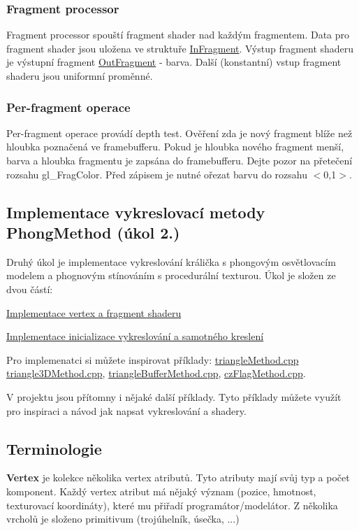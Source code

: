  \hypertarget{index_FragmentProcessor}{}\subsubsection{Fragment processor}\label{index_FragmentProcessor}
Fragment processor spouští fragment shader nad každým fragmentem. Data pro fragment shader jsou uložena ve struktuře \hyperlink{structInFragment}{In\+Fragment}. Výstup fragment shaderu je výstupní fragment \hyperlink{structOutFragment}{Out\+Fragment} -\/ barva. Další (konstantní) vstup fragment shaderu jsou uniformní proměnné. \hypertarget{index_PFO}{}\subsubsection{Per-\/fragment operace}\label{index_PFO}
Per-\/fragment operace provádí depth test. Ověření zda je nový fragment blíže než hloubka poznačená ve framebufferu. Pokud je hloubka nového fragment menší, barva a hloubka fragmentu je zapsána do framebufferu. Dejte pozor na přetečení rozsahu gl\+\_\+\+Frag\+Color. Před zápisem je nutné ořezat barvu do rozsahu $<$0,1$>$.

\hypertarget{index_PhongMethod}{}\subsection{Implementace vykreslovací metody Phong\+Method (úkol 2.)}\label{index_PhongMethod}
Druhý úkol je implementace vykreslování králička s phongovým osvětlovacím modelem a phognovým stínováním s procedurální texturou. Úkol je složen ze dvou částí\+: 
\begin{DoxyItemize}
\item \hyperlink{group__shader__side}{Implementace vertex a fragment shaderu} 
\item \hyperlink{group__cpu__side}{Implementace inicializace vykreslování a samotného kreslení} 
\end{DoxyItemize}Pro implemenatci si můžete inspirovat příklady\+: \hyperlink{triangleMethod_8cpp}{triangle\+Method.\+cpp} \hyperlink{triangle3DMethod_8cpp}{triangle3\+D\+Method.\+cpp}, \hyperlink{triangleBufferMethod_8cpp}{triangle\+Buffer\+Method.\+cpp}, \hyperlink{czFlagMethod_8cpp}{cz\+Flag\+Method.\+cpp}.



V projektu jsou přítomny i nějaké další příklady. Tyto příklady můžete využít pro inspiraci a návod jak napsat vykreslování a shadery.\hypertarget{index_terminologie}{}\subsection{Terminologie}\label{index_terminologie}
{\bfseries Vertex} je kolekce několika vertex atributů. Tyto atributy mají svůj typ a počet komponent. Každý vertex atribut má nějaký význam (pozice, hmotnost, texturovací koordináty), které mu přiřadí programátor/modelátor. Z několika vrcholů je složeno primitivum (trojúhelník, úsečka, ...)

